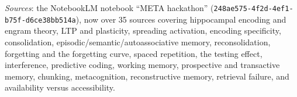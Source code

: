 \noindent\emph{Sources}: the NotebookLM notebook ``META hackathon''
(\texttt{248ae575-4f2d-4ef1-b75f-d6ce38bb514a}), now over 35 sources covering hippocampal encoding and
engram theory, LTP and plasticity, spreading activation, encoding specificity, consolidation,
episodic/semantic/autoassociative memory, reconsolidation, forgetting and the forgetting curve, spaced
repetition, the testing effect, interference, predictive coding, working memory, prospective and
transactive memory, chunking, metacognition, reconstructive memory, retrieval failure, and
availability versus accessibility.

